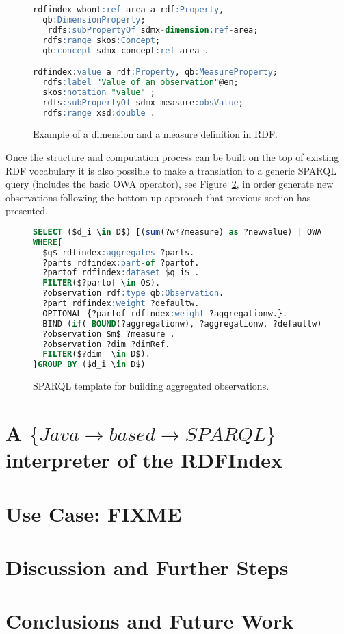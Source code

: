 \documentclass{llncs}
\begin{document}
\begin{figure}[!ht]
\begin{lstlisting}[language=SQL]  
rdfindex-wbont:ref-area a rdf:Property, 
  qb:DimensionProperty; 
   rdfs:subPropertyOf sdmx-dimension:ref-area; 
  rdfs:range skos:Concept; 
  qb:concept sdmx-concept:ref-area . 

rdfindex:value a rdf:Property, qb:MeasureProperty;
  rdfs:label "Value of an observation"@en;
  skos:notation "value" ;
  rdfs:subPropertyOf sdmx-measure:obsValue;
  rdfs:range xsd:double . 
\end{lstlisting}
\caption{Example of a dimension and a measure definition in RDF.}
 \label{fig:results-rdf-properties}
\end{figure}


Once the structure and computation process can be built on the top of existing RDF vocabulary it is also 
possible to make a translation to a generic SPARQL query (includes the basic OWA operator), see Figure~\ref{fig:results-rdf-sparql-template}, in order generate new observations following the bottom-up approach that previous section has presented.

\begin{figure}[ht]
\begin{lstlisting}[language=SQL,mathescape]  
SELECT ($d_i \in D$) [(sum(?w*?measure) as ?newvalue) | OWA(?measure)]
WHERE{
  $q$ rdfindex:aggregates ?parts.
  ?parts rdfindex:part-of ?partof.
  ?partof rdfindex:dataset $q_i$ .
  FILTER($?partof \in Q$).  
  ?observation rdf:type qb:Observation.
  ?part rdfindex:weight ?defaultw.     
  OPTIONAL {?partof rdfindex:weight ?aggregationw.}.
  BIND (if( BOUND(?aggregationw), ?aggregationw, ?defaultw) AS ?w)
  ?observation $m$ ?measure . 
  ?observation ?dim ?dimRef. 
  FILTER($?dim  \in D$).
}GROUP BY ($d_i \in D$)
\end{lstlisting}
\caption{SPARQL template for building aggregated observations.}
 \label{fig:results-rdf-sparql-template}
\end{figure}


\section{A $\{Java\rightarrow based \rightarrow SPARQL\}$  interpreter of the RDFIndex}
%
\section{Use Case: FIXME}
\section{Discussion and Further Steps}

\section{Conclusions and Future Work}



\end{document}
